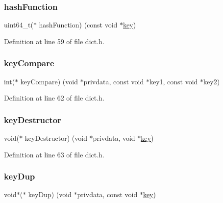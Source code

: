 \subsubsection{\texorpdfstring{hash\+Function}{hashFunction}}
{\footnotesize\ttfamily uint64\+\_\+t($\ast$ hash\+Function) (const void $\ast$\hyperlink{redis-check-rdb_8c_adc0ee0ed345db513fb6fac27511be4f1}{key})}



Definition at line 59 of file dict.\+h.

\mbox{\label{structdict_type_af973749ac3c53be917942afd20eeea0e}} 
\subsubsection{\texorpdfstring{key\+Compare}{keyCompare}}
{\footnotesize\ttfamily int($\ast$ key\+Compare) (void $\ast$privdata, const void $\ast$key1, const void $\ast$key2)}



Definition at line 62 of file dict.\+h.

\mbox{\label{structdict_type_a55bd09e65ce2b078c4d292dba93c8714}} 
\subsubsection{\texorpdfstring{key\+Destructor}{keyDestructor}}
{\footnotesize\ttfamily void($\ast$ key\+Destructor) (void $\ast$privdata, void $\ast$\hyperlink{redis-check-rdb_8c_adc0ee0ed345db513fb6fac27511be4f1}{key})}



Definition at line 63 of file dict.\+h.

\mbox{\label{structdict_type_a2dd82eb7e0e1186bb12e07019818e4c0}} 
\subsubsection{\texorpdfstring{key\+Dup}{keyDup}}
{\footnotesize\ttfamily void$\ast$($\ast$ key\+Dup) (void $\ast$privdata, const void $\ast$\hyperlink{redis-check-rdb_8c_adc0ee0ed345db513fb6fac27511be4f1}{key})}



